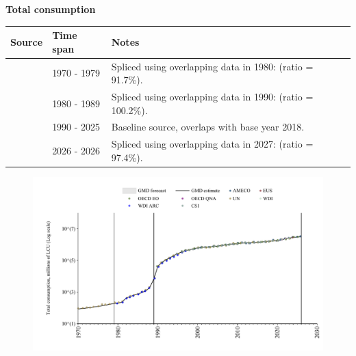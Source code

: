 \documentclass[12pt,a4paper,landscape]{article}
\begin{document}
\begin{adjustbox}{max totalsize={\paperwidth}{\paperheight},center}
\begin{minipage}[t][\textheight][t]{\textwidth}
\vspace*{0.5cm}
{}
\begin{center}
{\Large\bfseries Total consumption}
\end{center}
\vspace{0.5cm}
\begin{table}[H]
\centering
\small
\begin{tabular}{|l|l|l|}
\hline
\textbf{Source} & \textbf{Time span} & \textbf{Notes} \\
\hline
\rowcolor{white}\cite{UN}& 1970 - 1979 &Spliced using overlapping data in 1980: (ratio = 91.7\%). \\
\rowcolor{lightgray}\cite{AMECO}& 1980 - 1989 &Spliced using overlapping data in 1990: (ratio = 100.2\%). \\
\rowcolor{white}\cite{OECD_EO}& 1990 - 2025 &Baseline source, overlaps with base year 2018. \\
\rowcolor{lightgray}\cite{AMECO}& 2026 - 2026 &Spliced using overlapping data in 2027: (ratio = 97.4\%). \\
\hline
\end{tabular}
\end{table}
\begin{figure}[H]
\centering
\includegraphics[width=\textwidth,height=0.6\textheight,keepaspectratio]{graphs/POL_cons.pdf}
\end{figure}
\end{minipage}
\end{adjustbox}
\end{document}
